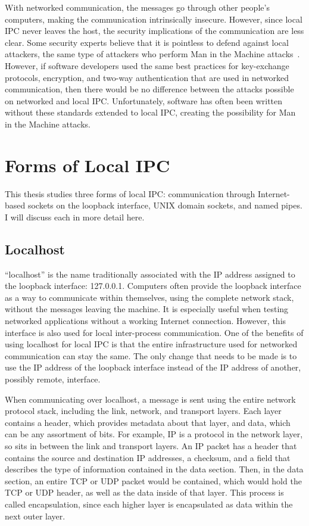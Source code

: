 With networked communication, the messages go through other people's computers, making the communication intrinsically insecure.  However, since local IPC never leaves the host, the security implications of the communication are less clear.  Some security experts believe that it is pointless to defend against local attackers, the same type of attackers who perform Man in the Machine attacks~\cite{MitMa}.  However, if software developers used the same best practices for key-exchange protocols, encryption, and two-way authentication that are used in networked communication, then there would be no difference between the attacks possible on networked and local IPC.  Unfortunately, software has often been written without these standards extended to local IPC, creating the possibility for Man in the Machine attacks.

\section{Forms of Local IPC}
\label{sec:formsOfLocalIPC}
This thesis studies three forms of local IPC: communication through Internet-based sockets on the loopback interface, UNIX domain sockets, and named pipes.  I will discuss each in more detail here.

\subsection{Localhost}
\label{sec:localhost}
``localhost'' is the name traditionally associated with the IP address assigned to the loopback interface: 127.0.0.1.  Computers often provide the loopback interface as a way to communicate within themselves, using the complete network stack, without the messages leaving the machine.  It is especially useful when testing networked applications without a working Internet connection.  However, this interface is also used for local inter-process communication.  One of the benefits of using localhost for local IPC is that the entire infrastructure used for networked communication can stay the same.  The only change that needs to be made is to use the IP address of the loopback interface instead of the IP address of another, possibly remote, interface.

When communicating over localhost, a message is sent using the entire network protocol stack, including the link, network, and transport layers.  Each layer contains a header, which provides metadata about that layer, and data, which can be any assortment of bits.  For example, IP is a protocol in the network layer, so sits in between the link and transport layers.  An IP packet has a header that contains the source and destination IP addresses, a checksum, and a field that describes the type of information contained in the data section.  Then, in the data section, an entire TCP or UDP packet would be contained, which would hold the TCP or UDP header, as well as the data inside of that layer.  This process is called encapsulation, since each higher layer is encapsulated as data within the next outer layer.

